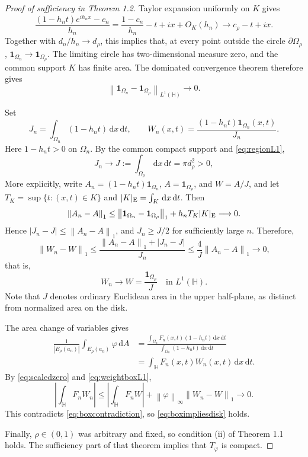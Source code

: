 \documentclass[12pt,a4paper]{article}
\theoremstyle{remark}
\newcommand{\dd}{\,\mathrm d}
\newcommand{\dA}{\,\mathrm dA}
\newcommand{\norm}[1]{\left\lVert#1\right\rVert}
\newcommand{\abs}[1]{\left\lvert#1\right\rvert}
\begin{document}
\begin{proof}[Proof of sufficiency in Theorem 1.2]
Taylor expansion uniformly on $K$ gives
\[
\frac{(1-h_nt)e^{ih_nx}-c_n}{h_n}
=\frac{1-c_n}{h_n}-t+ix+O_K(h_n)
\longrightarrow c_\rho-t+ix.
\]
Together with $d_n/h_n\to d_\rho$, this implies that, at every point outside the circle $\partial\Omega_\rho$,
$\mathbf1_{\Omega_n}\to\mathbf1_{\Omega_\rho}$.
The limiting circle has two-dimensional measure zero, and the common support $K$ has finite area. The dominated convergence theorem therefore gives
\begin{equation}\label{eq:regionL1}
\norm{\mathbf1_{\Omega_n}-\mathbf1_{\Omega_\rho}}_{L^1(\mathbb H)}\longrightarrow0.
\end{equation}


Set
\[
J_n=\int_{\Omega_n}(1-h_nt)\dd x\dd t,
\qquad
W_n(x,t)=\frac{(1-h_nt)\mathbf1_{\Omega_n}(x,t)}{J_n}.
\]
Here $1-h_nt>0$ on $\Omega_n$. By the common compact support and \eqref{eq:regionL1},
\[
J_n\longrightarrow J:=\int_{\Omega_\rho}\dd x\dd t=\pi d_\rho^2>0,
\]
More explicitly, write $A_n=(1-h_nt)\mathbf1_{\Omega_n}$, $A=\mathbf1_{\Omega_\rho}$, and $W=A/J$,
and let $T_K=\sup\{t:(x,t)\in K\}$ and $|K|_{\rm E}=\int_K\dd x\dd t$.
Then
\[
\norm{A_n-A}_1
\le\norm{\mathbf1_{\Omega_n}-\mathbf1_{\Omega_\rho}}_1
+h_nT_K|K|_{\rm E}\longrightarrow0.
\]
Hence $|J_n-J|\le\norm{A_n-A}_1$, and $J_n\ge J/2$ for sufficiently large $n$. Therefore,
\[
\norm{W_n-W}_1
\le\frac{\norm{A_n-A}_1+|J_n-J|}{J_n}
\le\frac4J\norm{A_n-A}_1\longrightarrow0,
\]
that is,
\begin{equation}\label{eq:weightboxL1}
W_n\longrightarrow W=\frac{\mathbf1_{\Omega_\rho}}{J}
\quad\text{in }L^1(\mathbb H).
\end{equation}
Note that $J$ denotes ordinary Euclidean area in the upper half-plane, as distinct from normalized area on the disk.

The area change of variables gives
\begin{align*}
\frac1{|E_\rho(a_n)|}\int_{E_\rho(a_n)}\varphi\dA
&=\frac{\int_{\Omega_n}F_n(x,t)(1-h_nt)\dd x\dd t}
 {\int_{\Omega_n}(1-h_nt)\dd x\dd t}\\
&=\int_{\mathbb H}F_n(x,t)W_n(x,t)\dd x\dd t.
\end{align*}
By \eqref{eq:scaledzero} and \eqref{eq:weightboxL1},
\[
\abs{\int_{\mathbb H}F_nW_n}
\le\abs{\int_{\mathbb H}F_nW}
+\norm\varphi_\infty\norm{W_n-W}_1\longrightarrow0.
\]
This contradicts \eqref{eq:boxcontradiction}, so \eqref{eq:boximpliesdisk} holds.

Finally, $\rho\in(0,1)$ was arbitrary and fixed, so condition
\textnormal{(ii)} of Theorem 1.1 holds. The sufficiency part of that theorem implies that $T_\varphi$ is compact.
\end{proof}
\end{document}

